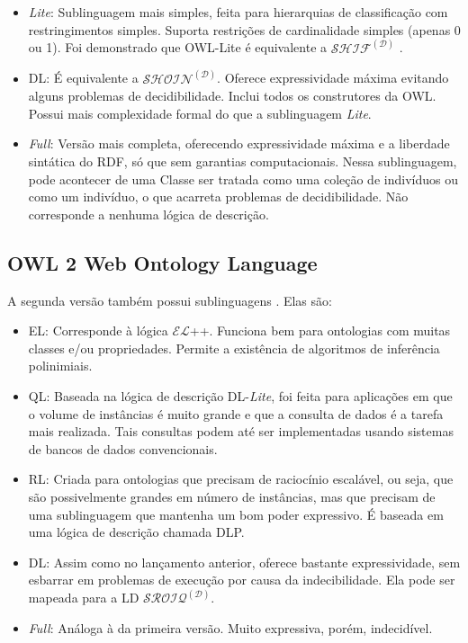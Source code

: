 \begin{itemize}
	\item \textit{Lite}: Sublinguagem mais simples, feita para hierarquias de classificação com restringimentos simples. Suporta restrições de cardinalidade simples (apenas 0 ou 1).  Foi demonstrado que OWL-Lite é equivalente a $ \mathcal{SHIF^{(D)}} $ \cite{ferramentasGrau}.
	\item DL: É equivalente a $ \mathcal{SHOIN^{(D)}} $. Oferece expressividade máxima evitando alguns problemas de decidibilidade. Inclui todos os construtores da OWL. Possui mais complexidade formal do que a sublinguagem \textit{Lite}.
	\item \textit{Full}: Versão mais completa, oferecendo expressividade máxima e a liberdade sintática do RDF, só que sem garantias computacionais. Nessa sublinguagem, pode acontecer de uma Classe ser tratada como uma coleção de indivíduos ou como um indivíduo, o que acarreta problemas de decidibilidade. Não corresponde a nenhuma lógica de descrição.
\end{itemize}

\subsection{OWL 2 Web Ontology Language}

A segunda versão também possui sublinguagens \cite{ferramentasOWL2}. Elas são:

\begin{itemize}
	\item EL: Corresponde à lógica $ \mathcal{EL} $++. Funciona bem para ontologias com muitas classes e/ou propriedades. Permite a existência de algoritmos de inferência polinimiais.
	\item QL: Baseada na lógica de descrição DL-\textit{Lite}, foi feita para aplicações em que o volume de instâncias é muito grande e que a consulta de dados é a tarefa mais realizada. Tais consultas podem até ser implementadas usando sistemas de bancos de dados convencionais.
	\item RL: Criada para ontologias que precisam de raciocínio escalável, ou seja, que são possivelmente grandes em número de instâncias, mas que precisam de uma sublinguagem que mantenha um bom poder expressivo. É baseada em uma lógica de descrição chamada DLP.
	\item DL: Assim como no lançamento anterior, oferece bastante expressividade, sem esbarrar em problemas de execução por causa da indecibilidade. Ela pode ser mapeada para a LD $ \mathcal{SROIQ^{(D)}} $. 
	\item \textit{Full}: Análoga à da primeira versão. Muito expressiva, porém, indecidível.
\end{itemize}

